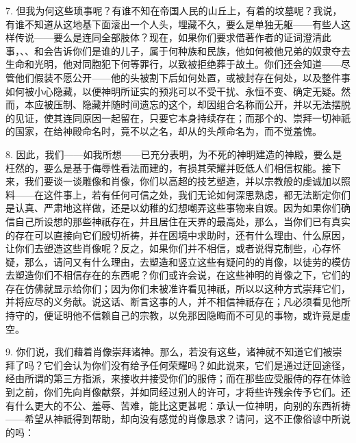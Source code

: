 7. 但我为何这些琐事呢？有谁不知在帝国人民的山丘上，有着的坟墓呢？我说，有谁不知道从这地基下面滚出一个人头，埋藏不久，要么是单独无躯——有些人这样传说——要么是连同全部肢体？现在，如果你们要求借著作者的证词澄清此事，、、和会告诉你们是谁的儿子，属于何种族和民族，他如何被他兄弟的奴隶夺去生命和光明，他对同胞犯下何等罪行，以致被拒绝葬于故土。你们还会知道——尽管他们假装不愿公开——他的头被割下后如何处置，或被封存在何处，以及整件事如何被小心隐藏，以便神明所证实的预兆可以不受干扰、永恒不变、确定无疑。然而，本应被压制、隐藏并随时间遗忘的这个，却因组合名称而公开，并以无法摆脱的见证，使其连同原因一起留在，只要它本身持续存在；而那个的、崇拜一切神祇的国家，在给神殿命名时，竟不以之名，却从的头颅命名为，而不觉羞愧。\par

8. 因此，我们——如我所想——已充分表明，为不死的神明建造的神殿，要么是枉然的，要么是基于侮辱性看法而建的，有损其荣耀并贬低人们相信权能。接下来，我们要谈一谈雕像和肖像，你们以高超的技艺塑造，并以宗教般的虔诚加以照料——在这件事上，若有任何可信之处，我们无论如何深思熟虑，都无法断定你们是认真、严肃地这样做，还是以幼稚的幻想嘲弄这些事物来自娱。因为如果你们确信自己所设想的那些神祇存在，并且居住在天界的最高处，那么，当你们已有真实的存在可以直接向它们殷切祈祷，并在困境中求助时，还有什么理由、什么原因，让你们去塑造这些肖像呢？反之，如果你们并不相信，或者说得克制些，心存怀疑，那么，请问又有什么理由，去塑造和竖立这些有疑问的的肖像，以徒劳的模仿去塑造你们不相信存在的东西呢？你们或许会说，在这些神明的肖像之下，它们的存在仿佛就显示给你们；因为你们未被准许看见神祇，所以以这种方式崇拜它们，并将应尽的义务献。说这话、断言这事的人，并不相信神祇存在；凡必须看见他所持守的，便证明他不信赖自己的宗教，以免那因隐晦而不可见的事物，或许竟是虚空。\par

9. 你们说，我们藉着肖像崇拜诸神。那么，若没有这些，诸神就不知道它们被崇拜了吗？它们会认为你们没有给予任何荣耀吗？如此说来，它们是通过迂回途径，经由所谓的第三方指派，来接收并接受你们的服侍；而在那些应受服侍的存在体验到之前，你们先向肖像献祭，并如同经过别人的许可，才将些许残余传予它们。还有什么更大的不公、羞辱、苦难，能比这更甚呢：承认一位神明，向别的东西祈祷——希望从神祇得到帮助，却向没有感觉的肖像恳求？请问，这不正像俗谚中所说的吗：\par


